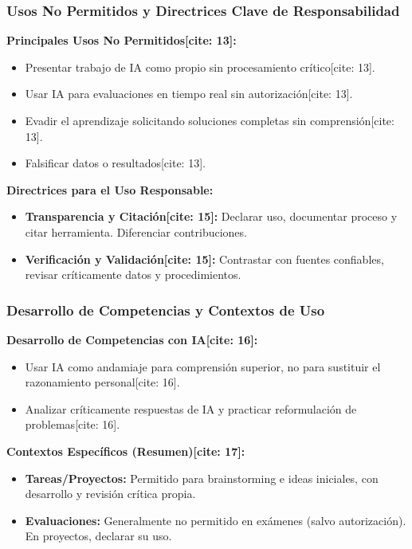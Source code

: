\documentclass{beamer}
\begin{document}
	\begin{frame}
		\frametitle{Usos No Permitidos y Directrices Clave de Responsabilidad}
		\textbf{Principales Usos No Permitidos[cite: 13]:}
		\begin{itemize}
			\item Presentar trabajo de IA como propio sin procesamiento crítico[cite: 13].
			\item Usar IA para evaluaciones en tiempo real sin autorización[cite: 13].
			\item Evadir el aprendizaje solicitando soluciones completas sin comprensión[cite: 13].
			\item Falsificar datos o resultados[cite: 13].
		\end{itemize}
		\vspace{0.5em} %
		\textbf{Directrices para el Uso Responsable:}
		\begin{itemize}
			\item \textbf{Transparencia y Citación[cite: 15]:} Declarar uso, documentar proceso y citar herramienta. Diferenciar contribuciones.
			\item \textbf{Verificación y Validación[cite: 15]:} Contrastar con fuentes confiables, revisar críticamente datos y procedimientos.
		\end{itemize}
	\end{frame}
	
	\begin{frame}
		\frametitle{Desarrollo de Competencias y Contextos de Uso}
		\textbf{Desarrollo de Competencias con IA[cite: 16]:}
		\begin{itemize}
			\item Usar IA como andamiaje para comprensión superior, no para sustituir el razonamiento personal[cite: 16].
			\item Analizar críticamente respuestas de IA y practicar reformulación de problemas[cite: 16].
		\end{itemize}
		\vspace{0.5em}
		\textbf{Contextos Específicos (Resumen)[cite: 17]:}
		\begin{itemize}
			\item \textbf{Tareas/Proyectos:} Permitido para brainstorming e ideas iniciales, con desarrollo y revisión crítica propia.
			\item \textbf{Evaluaciones:} Generalmente no permitido en exámenes (salvo autorización). En proyectos, declarar su uso.
		\end{itemize}
	\end{frame}
	
\end{document}

